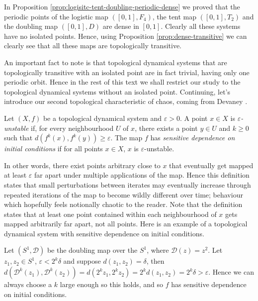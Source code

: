 \begin{exmp} \label{exmp:logistic-tent-doubling-transitive}
    In Proposition \ref{prop:logisitc-tent-doubling-periodic-dense} we proved that the periodic points of the logistic map $([0, 1], F_4)$, the tent map $([0, 1], T_2)$ and the doubling map $([0, 1], D)$ are dense in $[0, 1]$. Clearly all these systems have no isolated points. Hence, using Proposition \ref{prop:dense-transitive} we can clearly see that all these maps are topologically transitive.
\end{exmp}

An important fact to note is that topological dynamical systems that are topologically transitive with an isolated point are in fact trivial, having only one periodic orbit. Hence in the rest of this text we shall restrict our study to the topological dynamical systems without an isolated point. Continuing, let's introduce our second topological characteristic of chaos, coming from Devaney \cite{devaney}.

\begin{defn} \label{defn:sensitive-dependence}
    Let $(X, f)$ be a topological dynamical system and $\varepsilon > 0$. A point $x \in X$ is \emph{$\varepsilon$-unstable} if, for every neighbourhood $U$ of $x$, there exists a point $y \in U$ and $k \geq 0$ such that $d\left(f^k(x), f^k(y)\right) \geq \varepsilon$. The map $f$ has \emph{sensitive dependence on initial conditions} if for all points $x \in X$, $x$ is $\varepsilon$-unstable.
\end{defn}

In other words, there exist points arbitrary close to $x$ that eventually get mapped at least $\varepsilon$ far apart under multiple applications of the map. Hence this definition states that small perturbations between iterates may eventually increase through repeated iterations of the map to become wildly different over time; behaviour which hopefully feels notionally chaotic to the reader. Note that the definition states that at least one point contained within each neighbourhood of $x$ gets mapped arbitrarily far apart, not all points. Here is an example of a topological dynamical system with sensitive dependence on initial conditions.

\begin{exmp} \label{exmp:doubling-map-s1-sensitive}
    Let $(S^1, \mathcal{D})$ be the doubling map over the $S^1$, where $\mathcal{D}(z) = z^2$. Let $z_1, z_2 \in S^1$, $\varepsilon < 2^k \delta$ and suppose $d(z_1, z_2) = \delta$, then $d\left(\mathcal{D}^k(z_1), \mathcal{D}^k(z_2)\right) =  d\left(2^kz_1, 2^kz_2\right) = 2^k d(z_1, z_2) = 2^k \delta > \varepsilon$. Hence we can always choose a $k$ large enough so this holds, and so $f$ has sensitive dependence on initial conditions.
\end{exmp}

